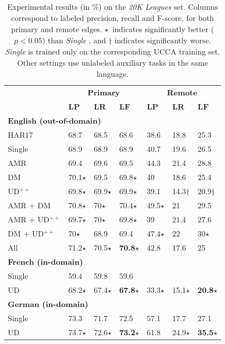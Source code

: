 \documentclass[11pt,a4paper]{article}
\begin{document}
\begin{table}[t]
\centering
\small
\setlength\tabcolsep{3pt}
\begin{tabular}{l|lll|lll}
& \multicolumn{3}{c|}{\footnotesize \bf Primary} & \multicolumn{3}{c}{\footnotesize \bf Remote} \\
& \footnotesize \textbf{LP} & \footnotesize \textbf{LR} & \footnotesize \textbf{LF}
& \footnotesize \textbf{LP} & \footnotesize \textbf{LR} & \footnotesize \textbf{LF} \\
\hline
\multicolumn{4}{l|}{\small \bf English (out-of-domain)} & \\
\footnotesize HAR17
& 68.7 & 68.5 & 68.6 & 38.6 & 18.8 & 25.3 \\
\footnotesize Single
& 68.9 & 68.9 & 68.9 & 40.7 & 19.6 & 26.5 \\
\cline{1-1}
\footnotesize AMR
& 69.4 & 69.6 & 69.5 & 44.3 & 21.4 & 28.8 \\
\footnotesize DM
& 70.1$\star$ & 69.5 & 69.8$\star$ & 40 & 18.6 & 25.4 \\
\footnotesize UD$^{++}$
& 69.8$\star$ & 69.9$\star$ & 69.9$\star$ & 39.1 & 14.3$\dagger$ & 20.9$\dagger$ \\
\footnotesize AMR + DM
& 70.8$\star$ & 70$\star$ & 70.4$\star$ & 49.5$\star$ & 21 & 29.5 \\
\footnotesize AMR + UD$^{++}$
& 69.7$\star$ & 70$\star$ & 69.8$\star$ & 39 & 21.4 & 27.6 \\
\footnotesize DM + UD$^{++}$
& 70$\star$ & 68.9 & 69.4 & 47.4$\star$ & 22 & 30$\star$ \\
\footnotesize All
& 71.2$\star$ & 70.5$\star$ & \textbf{70.8}$\star$ & 42.8 & 17.6 & 25 \\
\hline
\multicolumn{4}{l|}{\small \bf French (in-domain)} & \\
\small Single & 59.4 & 59.8 & 59.6 & \enskip 5.9 & \enskip 1.9 & \enskip 2.9 \\
\small UD & 68.2$\star$ & 67.4$\star$ & \textbf{67.8}$\star$ & 33.3$\star$ & 15.1$\star$ & \textbf{20.8}$\star$ \\
\hline
\multicolumn{4}{l|}{\small \bf German (in-domain)} & \\
\small Single & 73.3 & 71.7 & 72.5 & 57.1 & 17.7 & 27.1 \\
\small UD & 73.7$\star$ & 72.6$\star$ & \textbf{73.2}$\star$ & 61.8 & 24.9$\star$ & \textbf{35.5}$\star$
\end{tabular}
\caption{
Experimental results (in \%) on the \textit{20K Leagues} set.
Columns correspond to labeled precision, recall and F-score,
for both primary and remote edges.
$\star$~indicates significantly better ($p<0.05$)
than \textit{Single} \cite[bootstrap test; ][]{berg2012empirical},
and $\dagger$ indicates significantly worse.
\textit{Single} is trained only on the corresponding UCCA training set.
Other settings use unlabeled auxiliary tasks in the same language.
}
\label{tab:ood_results}
\end{table}
\end{document}
